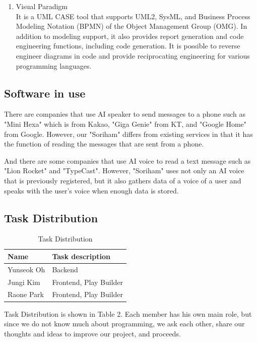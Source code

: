 \documentclass[conference]{IEEEtran}
\begin{document}
\begin{enumerate}
\begin{enumerate}
        \item Visual Paradigm\\
        It is a UML CASE tool that supports UML2, SysML, and Business Process Modeling Notation (BPMN) of the Object Management Group (OMG). In addition to modeling support, it also provides report generation and code engineering functions, including code generation. It is possible to reverse engineer diagrams in code and provide reciprocating engineering for various programming languages.\\
    \end{enumerate}
\end{enumerate}

\subsection{Software in use}
There are companies that use AI speaker to send messages to a phone such as "Mini Hexa" which is from Kakao, "Giga Genie" from KT, and "Google Home" from Google. However, our "Soriham" differs from existing services in that it has the function of reading the messages that are sent from a phone. 

And there are some companies that use AI voice to read a text message such as "Lion Rocket" and "TypeCast". However, "Soriham" uses not only an AI voice that is previously registered, but it also gathers data of a voice of a user and speaks with the user's voice when enough data is stored.\\

\subsection{Task Distribution}

\begin{table}[htbp]
\begin{center}
\caption{Task Distribution}
\begin{tabular}{|l|l|}
\hline
Name        & Task description          \\ \hline
Yunseok Oh  & Backend                   \\ \hline
Jungi Kim   & Frontend, Play Builder    \\ \hline
Raone Park  & Frontend, Play Builder    \\ \hline
\end{tabular}
\end{center}
\end{table}
Task Distribution is shown in Table 2. Each member has his own main role, but since we do not know much about programming, we ask each other, share our thoughts and ideas to improve our project, and proceeds.\\
\end{document}
